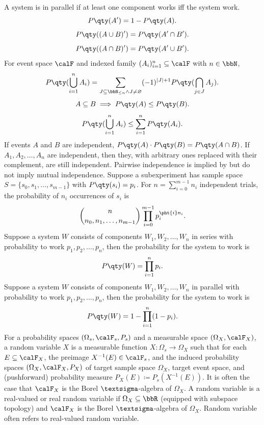 \documentclass[a4paper,12pt]{report}
\begin{document}
A system is in parallel if at least one component works iff the system work.
\[P\qty(A')=1-P\qty(A).\]
\[P\qty((A\cup B)')=P\qty(A'\cap B').\]
\[P\qty((A\cap B)')=P\qty(A'\cup B').\]
For event space $\calF$ and indexed family $(A_i)_{i=1}^n\subseteq\calF$ with $n\in\bbN$,
\[P\qty(\bigcup_{i=1}^nA_i)=\sum_{J\subseteq\bbN_{\leq n}\land J\neq\varnothing}(-1)^{|J|+1}P\qty(\bigcap_{j\in J}A_j).\]
\[A\subseteq B\implies P\qty(A)\le P\qty(B).\]
\[P\qty(\bigcup_{i=1}^nA_i)\le\sum_{i=1}^nP\qty(A_i).\]
If events $A$ and $B$ are independent, $P\qty(A)\cdot P\qty(B)=P\qty(A\cap B)$.
If $A_1,A_2,\ldots,A_n$ are independent, then they, with arbitrary ones replaced with their complement, are still independent.
Pairwise independence is implied by but do not imply mutual independence.
Suppose a subexperiment has sample space $S=\{s_0,s_1,\ldots,s_{m-1}\}$ with $P\qty(s_i)=p_i$. For $n=\sum_{i=0}^{m-1}n_i$ independent trials, the probability of $n_i$ occurrences of $s_i$ is
\[\binom{n}{n_0,n_1,\ldots,n_{m-1}}\prod_{i=0}^{m-1}p_i^{\pht{i}n_i}.\]
Suppose a system $W$ consists of components $W_1,W_2,\ldots,W_n$ in series with probability to work $p_1,p_2,\ldots,p_n$, then the probability for the system to work is
\[P\qty(W)=\prod_{i=1}^np_i.\]
Suppose a system $W$ consists of components $W_1,W_2,\ldots,W_n$ in parallel with probability to work $p_1,p_2,\ldots,p_n$, then the probability for the system to work is
\[P\qty(W)=1-\prod_{i=1}^n(1-p_i).\]
For a probability spaces $(\Omega_s,\calF_s,P_s)$ and a measurable space $(\Omega_X,\calF_X)$, a random variable $X$ is a measurable function $X\colon\Omega_s\to\Omega_X$ such that for each $E\subseteq\calF_X$, the preimage $X^{-1}(E)\in\calF_s$, and the induced probability spaces $(\Omega_X,\calF_X,P_X)$ of target sample space $\Omega_X$, target event space, and (pushforward) probability measure $P_X(E)\coloneq P_s(X^{-1}(E))$. It is often the case that $\calF_X$ is the Borel $\text{\textsigma}$-algebra of $\Omega_X$.
A random variable is a real-valued or real random variable if $\Omega_X\subseteq\bbR$ (equipped with subspace topology) and $\calF_X$ is the Borel $\text{\textsigma}$-algebra of $\Omega_X$. Random variable often refers to real-valued random variable.
\end{document}
